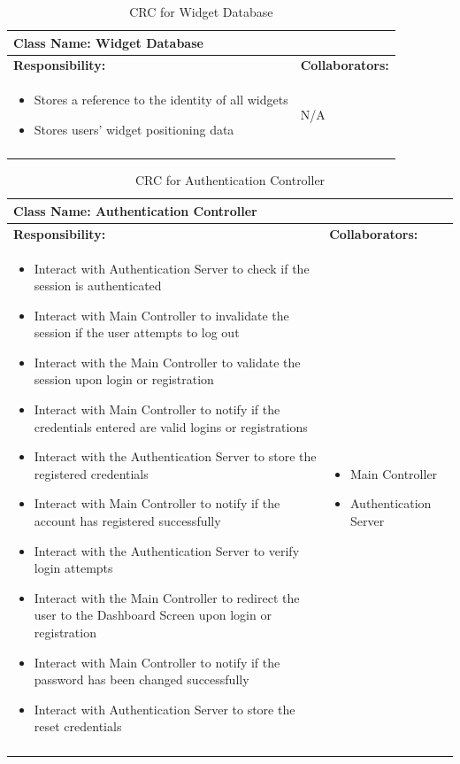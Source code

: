 \documentclass[]{article}
\begin{document}
\begin{longtable}{| p{} | p{} |}
	\hline
	\multicolumn{2}{|l|}{\textbf{Class Name: Widget Database}} \\
	\hline
	\textbf{Responsibility:} & \textbf{Collaborators:} \\
	\hline
	\begin{itemize}
		\item Stores a reference to the identity of all widgets
		\item Stores users' widget positioning data
    \end{itemize} & \newline \newline N/A \\
	\hline
	\caption{CRC for Widget Database}
\end{longtable}
\newpage
\begin{longtable}{| p{} | p{} |}
	\hline
	\multicolumn{2}{|l|}{\textbf{Class Name: Authentication Controller}} \\
	\hline
	\textbf{Responsibility:} & \textbf{Collaborators:} \\
	\hline
	\begin{itemize}
		\item Interact with Authentication Server to check if the session is authenticated
	    \item Interact with Main Controller to invalidate the session if the user attempts to log out
	    \item Interact with the Main Controller to validate the session upon login or registration
	    \item Interact with Main Controller to notify if the credentials entered are valid logins or registrations
		\item Interact with the Authentication Server to store the registered credentials
		\item Interact with Main Controller to notify if the account has registered successfully
		\item Interact with the Authentication Server to verify login attempts
		\item Interact with the Main Controller to redirect the user to the Dashboard Screen upon login or registration 
		\item Interact with Main Controller to notify if the password has been changed successfully
		\item Interact with Authentication Server to store the reset credentials
    \end{itemize} & 
	\begin{itemize}
	    \item Main Controller
		\item Authentication Server
	\end{itemize} \\
	\hline
	\caption{CRC for Authentication Controller}
\end{longtable}
\end{document}
